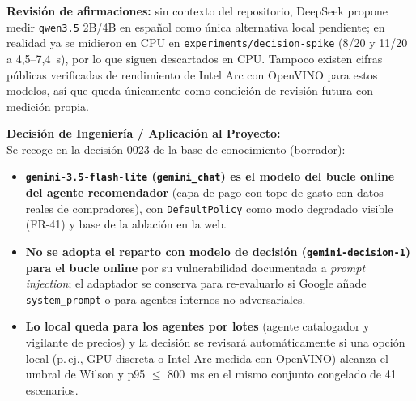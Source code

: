 \textbf{Revisión de afirmaciones:} sin contexto del repositorio, DeepSeek propone medir \texttt{qwen3.5} 2B/4B en español como única alternativa local pendiente; en realidad ya se midieron en CPU en \texttt{experiments/decision-spike} (8/20 y 11/20 a 4,5--7,4~s), por lo que siguen descartados en CPU. Tampoco existen cifras públicas verificadas de rendimiento de Intel Arc con OpenVINO para estos modelos, así que queda únicamente como condición de revisión futura con medición propia.

\textbf{Decisión de Ingeniería / Aplicación al Proyecto:} \\
Se recoge en la decisión 0023 de la base de conocimiento (borrador):
\begin{itemize}
	\item \textbf{\texttt{gemini-3.5-flash-lite} (\texttt{gemini\_chat}) es el modelo del bucle online del agente recomendador} (capa de pago con tope de gasto con datos reales de compradores), con \texttt{DefaultPolicy} como modo degradado visible (FR-41) y base de la ablación en la web.
	\item \textbf{No se adopta el reparto con modelo de decisión (\texttt{gemini-decision-1}) para el bucle online} por su vulnerabilidad documentada a \textit{prompt injection}; el adaptador se conserva para re-evaluarlo si Google añade \texttt{system\_prompt} o para agentes internos no adversariales.
	\item \textbf{Lo local queda para los agentes por lotes} (agente catalogador y vigilante de precios) y la decisión se revisará automáticamente si una opción local (p.\,ej., GPU discreta o Intel Arc medida con OpenVINO) alcanza el umbral de Wilson y p95 $\le$ 800~ms en el mismo conjunto congelado de 41 escenarios.
\end{itemize}

\vspace{0.5cm}
